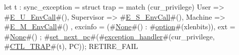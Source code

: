 let t : sync_exception =
  struct { trap = match (cur_privilege) {
                    User       => #\hyperref[sailRISCVzEzyUzyEnvCall]{E\_U\_EnvCall}#(),
                    Supervisor => #\hyperref[sailRISCVzEzySzyEnvCall]{E\_S\_EnvCall}#(),
                    Machine    => #\hyperref[sailRISCVzEzyMzyEnvCall]{E\_M\_EnvCall}#()
                  },
           excinfo = (#\hyperref[sailRISCVzNone]{None}#() : #\hyperref[sailRISCVzoption]{option}#(xlenbits)),
           ext     = #\hyperref[sailRISCVzNone]{None}#() };
#\hyperref[sailRISCVzsetzynextzypc]{set\_next\_pc}#(#\hyperref[sailRISCVzexceptionzyhandler]{exception\_handler}#(cur_privilege, #\hyperref[sailRISCVzCTLzyTRAP]{CTL\_TRAP}#(t), PC));
RETIRE_FAIL
